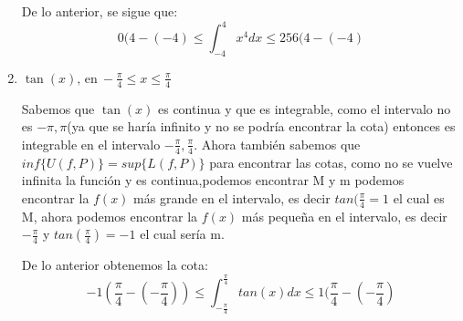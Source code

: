 \documentclass[12pt]{article}
\begin{document}
\begin{enumerate}[\hspace{9px} a)]
        De lo anterior, se sigue que:
        \[0(4-(-4) \leq \int_{-4}^{4}x^4dx \leq 256(4-(-4)\]

    \item \(\tan(x) \text{, en} \ -\displaystyle\frac{\pi}{4} \leq x \leq \frac{\pi}{4}\) \medskip

        Sabemos que $\tan(x)$ es continua y que es integrable, como el intervalo no es $-\pi,\pi$(ya que se haría infinito y no se podría encontrar la cota) entonces es integrable en el intervalo \(-\frac{\pi}{4},\frac{\pi}{4}\). Ahora también sabemos que $inf\{U(f,P)\}=sup\{L(f,P)\}$ para encontrar las cotas, como no se vuelve infinita la función y es continua,podemos encontrar M y m podemos encontrar la $f(x)$ más grande en el intervalo, es decir $tan(\frac{\pi}{4}=1$ el cual es M, ahora podemos encontrar la $f(x)$ más pequeña en el intervalo, es decir $-\frac{\pi}{4}$
        y \(tan(\frac{\pi}{4})=-1\) el cual sería m.\medskip

        De lo anterior obtenemos la cota:
        \[-1(\frac{\pi}{4}-(-\frac{\pi}{4})) \leq \int_{-\frac{\pi}{4}}^{\frac{\pi}{4}}tan(x)dx \leq 1(\frac{\pi}{4}-(-\frac{\pi}{4})\]

\end{enumerate}
\end{document}

